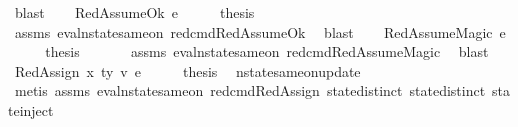 \begin{isabellebody}
\ blast\isanewline
{}\isamarkupfalse%
\isanewline
\ \ \isamarkupfalse%
\ {\isacharparenleft}{\kern0pt}RedAssumeOk\ e{\isacharparenright}{\kern0pt}\isanewline
\ \ \isamarkupfalse%
\ \isamarkupfalse%
\ {\isacharquery}{\kern0pt}thesis\ \isanewline
\ \ \ \ \isamarkupfalse%
\ assms{\isacharparenleft}{\kern0pt}{}{\isacharparenright}{\kern0pt}\ eval{\isacharunderscore}{\kern0pt}nstate{\isacharunderscore}{\kern0pt}same{\isacharunderscore}{\kern0pt}on{\isacharparenleft}{\kern0pt}{}{\isacharparenright}{\kern0pt}\ red{\isacharunderscore}{\kern0pt}cmd{\isachardot}{\kern0pt}RedAssumeOk\ \isamarkupfalse%
\ blast\isanewline
{}\isamarkupfalse%
\isanewline
\ \ \isamarkupfalse%
\ {\isacharparenleft}{\kern0pt}RedAssumeMagic\ e{\isacharparenright}{\kern0pt}\isanewline
\ \ \isamarkupfalse%
\ \isamarkupfalse%
\ {\isacharquery}{\kern0pt}thesis\ \isanewline
\ \ \ \ \isamarkupfalse%
\ assms{\isacharparenleft}{\kern0pt}{}{\isacharparenright}{\kern0pt}\ eval{\isacharunderscore}{\kern0pt}nstate{\isacharunderscore}{\kern0pt}same{\isacharunderscore}{\kern0pt}on{\isacharparenleft}{\kern0pt}{}{\isacharparenright}{\kern0pt}\ red{\isacharunderscore}{\kern0pt}cmd{\isachardot}{\kern0pt}RedAssumeMagic\ \isamarkupfalse%
\ blast\isanewline
{}\isamarkupfalse%
\isanewline
\ \ \isamarkupfalse%
\ {\isacharparenleft}{\kern0pt}RedAssign\ x\ ty\ v\ e{\isacharparenright}{\kern0pt}\isanewline
\ \ \isamarkupfalse%
\ \isamarkupfalse%
\ {\isacharquery}{\kern0pt}thesis\ \isamarkupfalse%
\ nstate{\isacharunderscore}{\kern0pt}same{\isacharunderscore}{\kern0pt}on{\isacharunderscore}{\kern0pt}update{\isacharunderscore}{\kern0pt}{}\isanewline
\ \ \isamarkupfalse%
\ {\isacharparenleft}{\kern0pt}metis\ assms{\isacharparenleft}{\kern0pt}{}{\isacharparenright}{\kern0pt}\ eval{\isacharunderscore}{\kern0pt}nstate{\isacharunderscore}{\kern0pt}same{\isacharunderscore}{\kern0pt}on{\isacharparenleft}{\kern0pt}{}{\isacharparenright}{\kern0pt}\ red{\isacharunderscore}{\kern0pt}cmd{\isachardot}{\kern0pt}RedAssign\ state{\isachardot}{\kern0pt}distinct{\isacharparenleft}{\kern0pt}{}{\isacharparenright}{\kern0pt}\ state{\isachardot}{\kern0pt}distinct{\isacharparenleft}{\kern0pt}{}{\isacharparenright}{\kern0pt}\ state{\isachardot}{\kern0pt}inject{\isacharparenright}{\kern0pt}\isanewline

\end{isabellebody}
